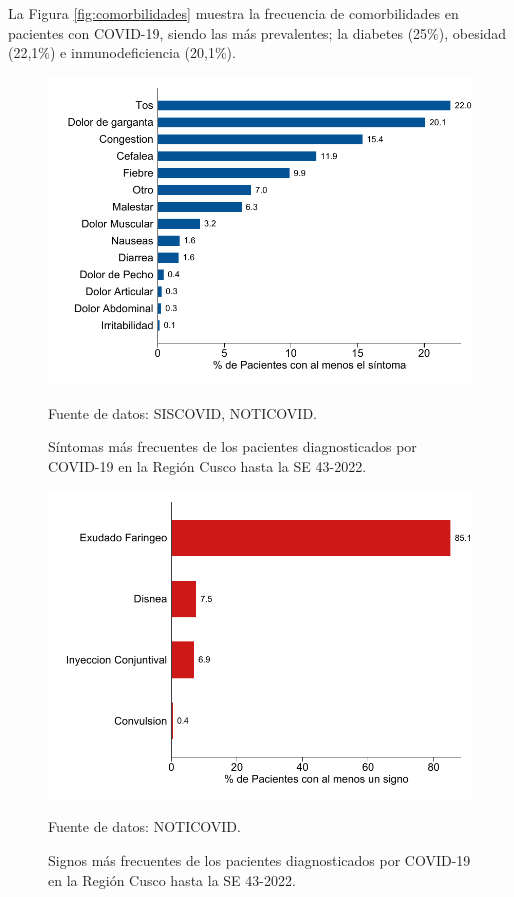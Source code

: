 \documentclass[12pt,a4paper,openany]{book}
\begin{document}
	\noindent La Figura \ref{fig:comorbilidades} muestra la frecuencia de comorbilidades en pacientes con COVID-19, siendo las más prevalentes; la diabetes (25$\%$), obesidad (22,1$\%$) e inmunodeficiencia (20,1$\%$).
	  
	 
	
	\begin{figure}[h]
		\caption{Síntomas más frecuentes de los pacientes diagnosticados por COVID-19 en la Región Cusco hasta la SE 43-2022.  }\label{fig:sintomas}
		\begin{center}
			\includegraphics[width=0.85\linewidth]{../figuras/figura_sintoma.pdf}
		\end{center}
		{\footnotesize {Fuente de datos: SISCOVID, NOTICOVID.}}
	\end{figure}
	
	\begin{figure}[h]
		\caption{Signos más frecuentes de los pacientes diagnosticados por COVID-19 en la Región Cusco hasta la SE 43-2022.}\label{fig:signos}
		\begin{center}
			\includegraphics[width=0.65\linewidth]{../figuras/figura_signo.pdf}
		\end{center}
		{\footnotesize {Fuente de datos: NOTICOVID.}}
	\end{figure}
	
\end{document}
